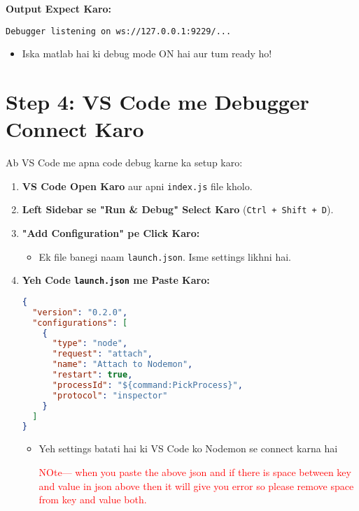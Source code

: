 \documentclass[a4paper,12pt]{article}
\begin{document}
\textbf{\color{myblue}Output Expect Karo:}  
\begin{verbatim}
Debugger listening on ws://127.0.0.1:9229/...
\end{verbatim}
\begin{itemize}
    \item Iska matlab hai ki debug mode ON hai aur tum ready ho!
\end{itemize}

\section{ Step 4: VS Code me Debugger Connect Karo}
Ab VS Code me apna code debug karne ka setup karo:  
\begin{enumerate}
    \item \textbf{\color{myblue}VS Code Open Karo} aur apni \texttt{\color{mygreen}index.js} file kholo.
    \item \textbf{\color{myblue}Left Sidebar se "Run \& Debug" Select Karo} (\texttt{\color{mygreen}Ctrl + Shift + D}).
    \item \textbf{\color{myblue}"Add Configuration" pe Click Karo:}  
    \begin{itemize}
        \item Ek file banegi naam \texttt{\color{mygreen}launch.json}. Isme settings likhni hai.
    \end{itemize}
    \item \textbf{\color{myblue}Yeh Code \texttt{\color{mygreen}launch.json} me Paste Karo:}  
    \begin{lstlisting}[language=JSON]
{
  "version": "0.2.0",
  "configurations": [
    {
      "type": "node",
      "request": "attach",
      "name": "Attach to Nodemon",
      "restart": true,
      "processId": "${command:PickProcess}",
      "protocol": "inspector"
    }
  ]
}
    \end{lstlisting}
    \begin{itemize}
        \item Yeh settings batati hai ki VS Code ko Nodemon se connect karna hai
        
      \textcolor{red}{%
    NOte--- when you paste the above json and if there is space between key and 
        value in json above then it will give you 
        error so please remove space from key and 
        value both.
    }

    
        

\end{itemize}
\end{enumerate}
\end{document}
